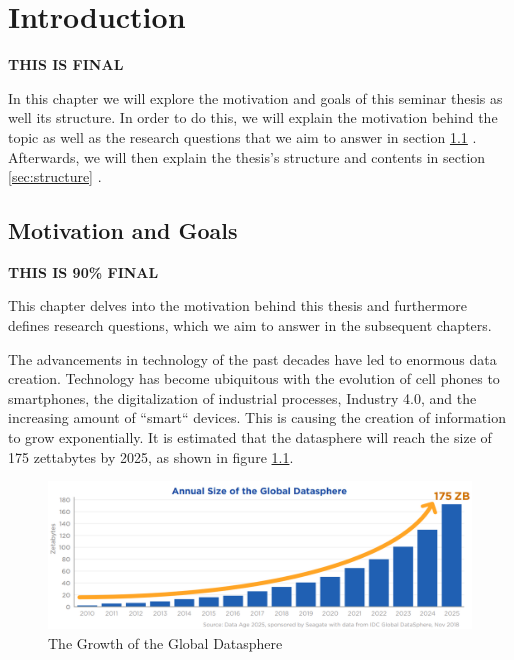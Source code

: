 \chapter{Introduction}
\label{cha:Introduction} %
\textbf{\color{green}THIS IS FINAL}

In this chapter we will explore the motivation and goals of this seminar thesis as well its structure.
In order to do this, we will explain the motivation behind the topic as well as the research questions that we aim to answer in section \ref{sec:motivation-goals} .
Afterwards, we will then explain the thesis's structure and contents in section \ref{sec:structure} .

\section{Motivation and Goals}
\label{sec:motivation-goals}
\textbf{\color{red}THIS IS 90\% FINAL}

This chapter delves into the motivation behind this thesis and furthermore defines research questions, which we aim to answer in the subsequent chapters.

\quad The advancements in technology of the past decades have led to enormous data creation. Technology has become ubiquitous 
with the evolution of cell phones to smartphones, the digitalization of industrial processes, Industry 4.0,
and the increasing amount of ``smart`` devices. This is causing the creation of information to grow exponentially.
It is estimated that the \gls{datasphere} will reach the size of 175 zettabytes by 2025, as shown in figure \ref{fig:growth_datasphere}.
\begin{figure}[ht]
\centering
\includegraphics[width=1.0\textwidth]{Bilder/size_global_datasphere.png}
\caption{The Growth of the Global Datasphere \cite[p. 6]{idc-seagate-data}}
\label{fig:growth_datasphere}
\end{figure}

